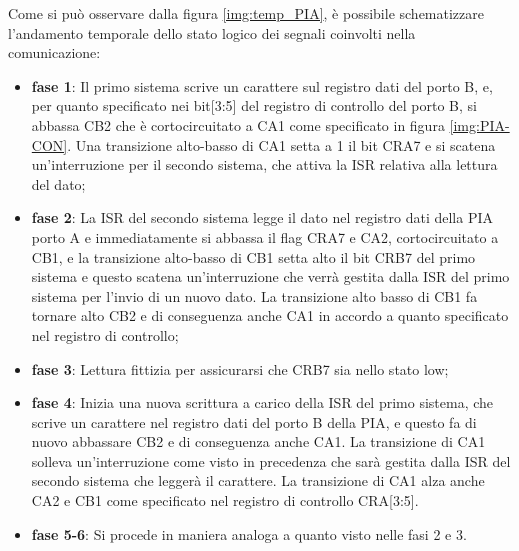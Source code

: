Come si può osservare dalla figura \ref{img:temp_PIA}, è possibile schematizzare l'andamento temporale dello stato logico dei segnali coinvolti nella comunicazione:
\begin{itemize}
    \item \textbf{fase 1}: Il primo sistema scrive un carattere sul registro dati del porto B, e, per quanto specificato nei bit[3:5] del registro di controllo del porto B, si abbassa CB2 che è cortocircuitato a CA1 come specificato in figura \ref{img:PIA-CON}. Una transizione alto-basso di CA1 setta a 1 il bit CRA7 e si scatena un'interruzione per il secondo sistema, che attiva la ISR relativa alla lettura del dato;
    \item \textbf{fase 2}: La ISR del secondo sistema legge il dato nel registro dati della PIA porto A e immediatamente si abbassa il flag CRA7 e CA2, cortocircuitato a CB1, e la transizione alto-basso di CB1 setta alto il bit CRB7 del primo sistema e questo scatena un'interruzione che verrà gestita dalla ISR del primo sistema per l'invio di un nuovo dato. La transizione alto basso di CB1 fa tornare alto CB2 e di conseguenza anche CA1 in accordo a quanto specificato nel registro di controllo;
    \item \textbf{fase 3}: Lettura fittizia per assicurarsi che CRB7 sia nello stato low;
    \item \textbf{fase 4}: Inizia una nuova scrittura a carico della ISR del primo sistema, che scrive un carattere nel registro dati del porto B della PIA, e questo fa di nuovo abbassare CB2 e di conseguenza anche CA1. La transizione di CA1 solleva un'interruzione come visto in precedenza che sarà gestita dalla ISR del secondo sistema che leggerà il carattere. La transizione di CA1 alza anche CA2 e CB1 come specificato nel registro di controllo CRA[3:5].
    \item \textbf{fase 5-6}: Si procede in maniera analoga a quanto visto nelle fasi 2 e 3.
\end{itemize}
\newpage


